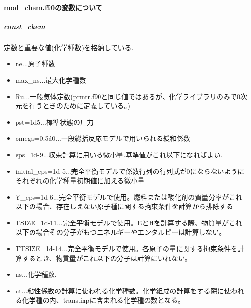 \documentclass{jsarticle}
\begin{document}
\paragraph{mod\_chem.f90の変数について}%
\subparagraph{const\_chem}定数と重要な値(化学種数)を格納している.
\begin{itemize}
\item ne...原子種数
\item max\_ns...最大化学種数
\item Ru...一般気体定数(prmtr.f90と同じ値ではあるが、化学ライブラリのみで0次元を行うときのために定義している。)
\item pst=1d5...標準状態の圧力
\item omega=0.5d0...一段総括反応モデルで用いられる緩和係数
\item eps=1d-9...収束計算に用いる微小量.基準値がこれ以下になればよい.
\item initial\_eps=1d-5...完全平衡モデルで係数行列の行列式が0にならないようにそれぞれの化学種量初期値に加える微小量
\item Y\_eps=1d-6...完全平衡モデルで使用。燃料または酸化剤の質量分率がこれ以下の場合、存在しえない原子種に関する拘束条件を計算から排除する.
\item TSIZE=1d-11...完全平衡モデルで使用。EとHを計算する際、物質量がこれ以下の場合その分子がもつエネルギーやエンタルピーは計算しない。
\item TTSIZE=1d-14...完全平衡モデルで使用。各原子の量に関する拘束条件を計算するとき、物質量がこれ以下の分子は計算にいれない。
\item ns...化学種数.
\item nt...粘性係数の計算に使われる化学種数。化学組成の計算をする際に使われる化学種の内、trans.inpに含まれる化学種の数となる。
\end{itemize}
\end{document}
